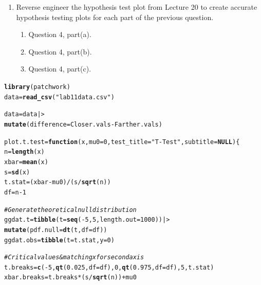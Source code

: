 \documentclass{article}\usepackage[]{graphicx}\usepackage[]{xcolor}
\makeatletter
\newcommand{\hlnum}[1]{\textcolor[rgb]{0.686,0.059,0.569}{#1}}%
\newcommand{\hlsng}[1]{\textcolor[rgb]{0.192,0.494,0.8}{#1}}%
\newcommand{\hlcom}[1]{\textcolor[rgb]{0.678,0.584,0.686}{\textit{#1}}}%
\newcommand{\hlopt}[1]{\textcolor[rgb]{0,0,0}{#1}}%
\newcommand{\hldef}[1]{\textcolor[rgb]{0.345,0.345,0.345}{#1}}%
\newcommand{\hlkwa}[1]{\textcolor[rgb]{0.161,0.373,0.58}{\textbf{#1}}}%
\newcommand{\hlkwb}[1]{\textcolor[rgb]{0.69,0.353,0.396}{#1}}%
\newcommand{\hlkwc}[1]{\textcolor[rgb]{0.333,0.667,0.333}{#1}}%
\newcommand{\hlkwd}[1]{\textcolor[rgb]{0.737,0.353,0.396}{\textbf{#1}}}%
\newenvironment{kframe}{%
 \def\at@end@of@kframe{}%
 \ifinner\ifhmode%
  \def\at@end@of@kframe{\end{minipage}}%
  \begin{minipage}{\columnwidth}%
 \fi\fi%
 \def\FrameCommand##1{\hskip\@totalleftmargin \hskip-\fboxsep
 \colorbox{shadecolor}{##1}\hskip-\fboxsep
     \hskip-\linewidth \hskip-\@totalleftmargin \hskip\columnwidth}%
 \MakeFramed {\advance\hsize-\width
   \@totalleftmargin\z@ \linewidth\hsize
   \@setminipage}}%
 {\par\unskip\endMakeFramed%
 \at@end@of@kframe}
\newenvironment{knitrout}{}{} %
\makeatother
\begin{document}
\begin{enumerate}
\item Reverse engineer the hypothesis test plot from Lecture 20 to create accurate
hypothesis testing plots for each part of the previous question.
\begin{enumerate}
  \item Question 4, part(a).
  \item Question 4, part(b).
  \item Question 4, part(c).
\end{enumerate}
\end{enumerate}

\begin{knitrout}
\color{fgcolor}\begin{kframe}
\begin{alltt}
\hlkwd{library}\hldef{(patchwork)}
\hldef{data} \hlkwb{=} \hlkwd{read_csv}\hldef{(}\hlsng{"lab11data.csv"}\hldef{)}

\hldef{data} \hlkwb{=} \hldef{data |>}
  \hlkwd{mutate}\hldef{(}\hlkwc{difference} \hldef{= Closer.vals} \hlopt{-} \hldef{Farther.vals)}

\hldef{plot.t.test} \hlkwb{=} \hlkwa{function}\hldef{(}\hlkwc{x}\hldef{,} \hlkwc{mu0} \hldef{=} \hlnum{0}\hldef{,} \hlkwc{test_title} \hldef{=} \hlsng{"T-Test"}\hldef{,} \hlkwc{subtitle} \hldef{=} \hlkwa{NULL}\hldef{) \{}
  \hldef{n} \hlkwb{=} \hlkwd{length}\hldef{(x)}
  \hldef{xbar} \hlkwb{=} \hlkwd{mean}\hldef{(x)}
  \hldef{s} \hlkwb{=} \hlkwd{sd}\hldef{(x)}
  \hldef{t.stat} \hlkwb{=} \hldef{(xbar} \hlopt{-} \hldef{mu0)} \hlopt{/} \hldef{(s} \hlopt{/} \hlkwd{sqrt}\hldef{(n))}
  \hldef{df} \hlkwb{=} \hldef{n} \hlopt{-} \hlnum{1}

  \hlcom{# Generate theoretical null distribution}
  \hldef{ggdat.t} \hlkwb{=} \hlkwd{tibble}\hldef{(}\hlkwc{t} \hldef{=} \hlkwd{seq}\hldef{(}\hlopt{-}\hlnum{5}\hldef{,} \hlnum{5}\hldef{,} \hlkwc{length.out} \hldef{=} \hlnum{1000}\hldef{)) |>}
    \hlkwd{mutate}\hldef{(}\hlkwc{pdf.null} \hldef{=} \hlkwd{dt}\hldef{(t,} \hlkwc{df} \hldef{= df))}
  \hldef{ggdat.obs} \hlkwb{=} \hlkwd{tibble}\hldef{(}\hlkwc{t} \hldef{= t.stat,} \hlkwc{y} \hldef{=} \hlnum{0}\hldef{)}

  \hlcom{# Critical values & matching x for second axis}
  \hldef{t.breaks} \hlkwb{=} \hlkwd{c}\hldef{(}\hlopt{-}\hlnum{5}\hldef{,} \hlkwd{qt}\hldef{(}\hlnum{0.025}\hldef{,} \hlkwc{df} \hldef{= df),} \hlnum{0}\hldef{,} \hlkwd{qt}\hldef{(}\hlnum{0.975}\hldef{,} \hlkwc{df} \hldef{= df),} \hlnum{5}\hldef{, t.stat)}
  \hldef{xbar.breaks} \hlkwb{=} \hldef{t.breaks} \hlopt{*} \hldef{(s} \hlopt{/} \hlkwd{sqrt}\hldef{(n))} \hlopt{+} \hldef{mu0}


\end{alltt}
\end{kframe}
\end{knitrout}
\end{document}
